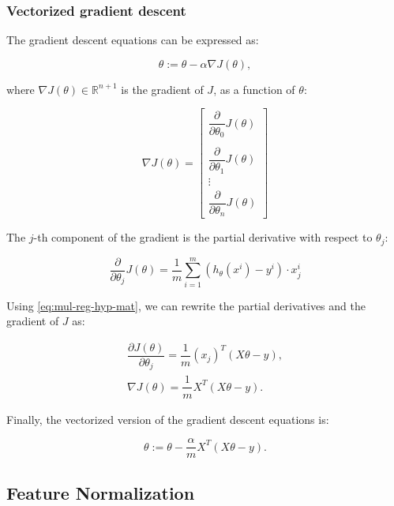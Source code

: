 \documentclass[a4paper,11pt]{report}
\begin{document}
\subsubsection*{Vectorized gradient descent}

The gradient descent equations can be expressed as:

$$ \theta := \theta - \alpha \nabla J(\theta), $$

where $\nabla J(\theta) \in \mathbb{R}^{n+1}$ is  the gradient of $J$, as a function of $\theta$:

$$\nabla J(\theta)  = \begin{bmatrix}
                        \dfrac{\partial}{\partial \theta_0}{J(\theta)}   \\\\
                        \dfrac{\partial}{\partial \theta_1}{J(\theta)}   \\
                        \vdots \\
                        \dfrac{\partial}{\partial \theta_n}{J(\theta)}
                      \end{bmatrix}$$

The $j$-th component of the gradient is the partial derivative with respect to $\theta_j$:

$$ \dfrac{\partial}{\partial \theta_j}J(\theta) = \dfrac{1}{m} \sum\limits_{i=1}^{m}  \left(h_\theta(x^{i}) - y^{i} \right) \cdot x_j^{i} $$

Using \eqref{eq:mul-reg-hyp-mat}, we can  rewrite the partial derivatives and the gradient of $J$ as:

\begin{equation*}
\begin{split}
\dfrac{\partial J(\theta)}{\partial \theta_j} = \dfrac{1}{m} (x_j)^{T} (X\theta - {y}), \\
\nabla J(\theta) = \dfrac{1}{m} X^{T} (X\theta - {y}).
\end{split}
\end{equation*}

Finally, the vectorized version of the gradient descent equations is:

\begin{equation}\label{eq:mul-reg-gdvect}
\theta := \theta - \frac{\alpha}{m} X^{T} (X\theta - {y}).
\end{equation}

\subsection*{Feature Normalization}
\end{document}
